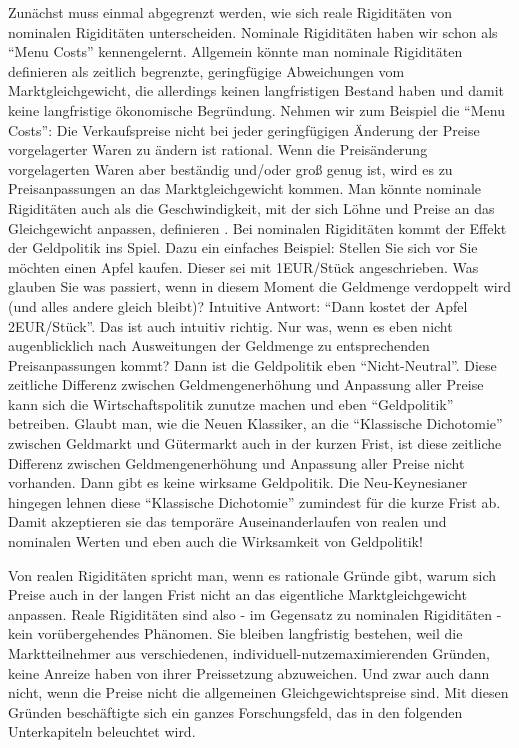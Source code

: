Zunächst muss einmal abgegrenzt werden, wie sich reale Rigiditäten von nominalen Rigiditäten unterscheiden. Nominale Rigiditäten haben wir schon als "`Menu Costs"' kennengelernt. Allgemein könnte man nominale Rigiditäten definieren als zeitlich begrenzte, geringfügige Abweichungen vom Marktgleichgewicht, die allerdings keinen langfristigen Bestand haben und damit keine langfristige ökonomische Begründung. Nehmen wir zum Beispiel die "`Menu Costs"': Die Verkaufspreise nicht bei jeder geringfügigen Änderung der Preise vorgelagerter Waren zu ändern ist rational. Wenn die Preisänderung vorgelagerten Waren aber beständig und/oder groß genug ist, wird es zu Preisanpassungen an das Marktgleichgewicht kommen. Man könnte nominale Rigiditäten auch als die Geschwindigkeit, mit der sich Löhne und Preise an das Gleichgewicht anpassen, definieren \parencite[S. 270]{Blanchard2003}. Bei nominalen Rigiditäten kommt der Effekt der Geldpolitik ins Spiel. Dazu ein einfaches Beispiel: Stellen Sie sich vor Sie möchten einen Apfel kaufen. Dieser sei mit 1EUR/Stück angeschrieben. Was glauben Sie was passiert, wenn in diesem Moment die Geldmenge verdoppelt wird (und alles andere gleich bleibt)? Intuitive Antwort: "`Dann kostet der Apfel 2EUR/Stück"'. Das ist auch intuitiv richtig. Nur was, wenn es eben nicht augenblicklich nach Ausweitungen der Geldmenge zu entsprechenden Preisanpassungen kommt? Dann ist die Geldpolitik eben "`Nicht-Neutral"'. Diese zeitliche Differenz zwischen Geldmengenerhöhung und Anpassung aller Preise kann sich die Wirtschaftspolitik zunutze machen und eben "`Geldpolitik"' betreiben. 
Glaubt man, wie die Neuen Klassiker, an die "`Klassische Dichotomie"' zwischen Geldmarkt und Gütermarkt auch in der kurzen Frist, ist diese zeitliche Differenz zwischen Geldmengenerhöhung und Anpassung aller Preise nicht vorhanden. Dann gibt es keine wirksame Geldpolitik. Die Neu-Keynesianer hingegen lehnen diese "`Klassische Dichotomie"' zumindest für die kurze Frist ab. Damit akzeptieren sie das temporäre Auseinanderlaufen von realen und nominalen Werten und eben auch die Wirksamkeit von Geldpolitik!

Von realen Rigiditäten spricht man, wenn es rationale Gründe gibt, warum sich Preise auch in der langen Frist nicht an das eigentliche Marktgleichgewicht anpassen. Reale Rigiditäten sind also - im Gegensatz zu nominalen Rigiditäten - kein vorübergehendes Phänomen. Sie bleiben langfristig bestehen, weil die Marktteilnehmer aus verschiedenen, individuell-nutzemaximierenden Gründen, keine Anreize haben von ihrer Preissetzung abzuweichen. Und zwar auch dann nicht, wenn die Preise nicht die allgemeinen Gleichgewichtspreise sind. Mit diesen Gründen beschäftigte sich ein ganzes Forschungsfeld, das in den folgenden Unterkapiteln beleuchtet wird. 


